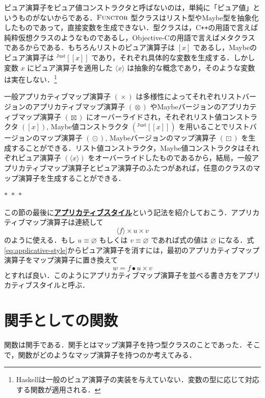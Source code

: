 \documentclass[a4paper,twocolumn]{jsbook}
\def\[{\left[\!\left[}
\def\]{\right]\!\right]}
\newcommand{\separator}{\begin{center}$*$~$*$~$*$\end{center}}
\newcommand{\programminglanguage}[1]{\textsf{#1}}
\newcommand{\cxx}{\programminglanguage{C}\texttt{++}}
\newcommand{\haskell}{\programminglanguage{Haskell}}
\newcommand{\objectivec}{\programminglanguage{Objective-C}}
\newcommand{\keyword}[1]{{\underline{\textbf{#1}}}}
\newcommand{\mPureNothing}{\varnothing}
\DeclareMathOperator{\mAppMap}{\times}
\DeclareMathOperator{\mAppMapList}{\otimes}
\DeclareMathOperator{\mAppMapMaybe}{\boxtimes}
\DeclareMathOperator{\mMap}{\bullet}
\DeclareMathOperator{\mMapList}{\odot}
\DeclareMathOperator{\mMapMaybe}{\boxdot}
\newcommand{\mGenericValueConstructor}[1]{\mathrm{#1}}
\newcommand{\mGenericWith}[2]{{}^\mGenericValueConstructor{#1}\[#2\]}
\newcommand{\mJustWith}[1]{\mGenericWith{Just}{#1}}
\newcommand{\mListWith}[1]{\left[#1\right]}
\newcommand{\mPureWith}[1]{\langle#1\rangle}
\newcommand{\mGenericTypeClass}[1]{\textsc{#1}} %
\newcommand{\mFunctorTypeClass}{\mGenericTypeClass{Functor}}
\begin{document}
ピュア演算子をピュア値コンストラクタと呼ばないのは，単純に「ピュア値」というものがないからである．$\mFunctorTypeClass$ 型クラスはリスト型やMaybe型を抽象化したものであって，直接変数を生成できない．型クラスは，\cxx の用語で言えば純粋仮想クラスのようなものであるし，\objectivec の用語で言えばメタクラスであるからである．もちろんリストのピュア演算子は $\mListWith{x}$ であるし，Maybeのピュア演算子は $\mJustWith{x}$ であり，それぞれ具体的な変数を生成する．しかし変数 $x$ にピュア演算子を適用した $\mPureWith{x}$ は抽象的な概念であり，そのような変数は実在しない．\footnote{\haskell は一般のピュア演算子の実装を与えていない．変数の型に応じて対応する関数が適用される．}

一般アプリカティブマップ演算子 $(\mAppMap)$ は多様性によってそれぞれリストバージョンのアプリカティブマップ演算子 $(\mAppMapList)$ やMaybeバージョンのアプリカティブマップ演算子 $(\mAppMapMaybe)$ にオーバーライドされ，それぞれリスト値コンストラクタ $(\mListWith{x})$, Maybe値コンストラクタ $(\mJustWith{x})$ を用いることでリストバージョンのマップ演算子 $(\mMapList)$, Maybeバージョンのマップ演算子 $(\mMapMaybe)$ を生成することができる．リスト値コンストラクタ，Maybe値コンストラクタはそれぞれピュア演算子 $(\mPureWith{x})$ をオーバーライドしたものであるから，結局，一般アプリカティブマップ演算子とピュア演算子のふたつがあれば，任意のクラスのマップ演算子を生成することができる．

\separator

この節の最後に\keyword{アプリカティブスタイル}という記法を紹介しておこう．アプリカティブマップ演算子は連続して
\begin{equation}
\label{eq:applicative-style}
\mPureWith{f}\mAppMap u\mAppMap v
\end{equation}
のように使える．もし $u\equiv\mPureNothing$ もしくは $v\equiv\mPureNothing$ であれば式の値は $\mPureNothing$ になる．式\eqref{eq:applicative-style}からピュア演算子を消すには，最初のアプリカティブマップ演算子をマップ演算子に置き換えて
\begin{equation}
w=f\mMap u\mAppMap v
\end{equation}
とすれば良い．このようにアプリカティブマップ演算子を並べる書き方をアプリカティブスタイルと呼ぶ．

\section{関手としての関数}

関数は関手である．関手とはマップ演算子を持つ型クラスのことであった．そこで，関数がどのようなマップ演算子を持つのか考えてみる．
\end{document}
